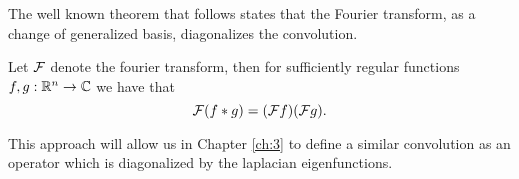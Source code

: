 \documentclass[../2.tex]{subfiles}
\begin{document}
The well known theorem that follows states that the Fourier transform, as a change of generalized basis, diagonalizes the convolution.

\begin{thm}
    Let $\mathcal{F}$ denote the fourier transform, then for sufficiently regular functions $f,g : \mathbb{R}^n \to \mathbb{C}$ we have that
    \[ \mathcal{F}(f * g) = (\mathcal{F}f)(\mathcal{F}g).\]
\end{thm}

This approach will allow us in Chapter \ref{ch:3} to define a similar convolution as an operator which is diagonalized by the laplacian eigenfunctions.
    
\end{document}
